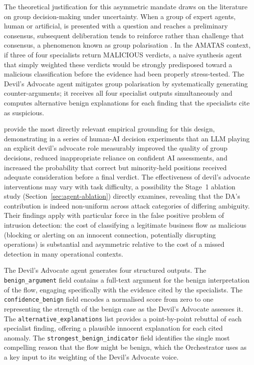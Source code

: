 \documentclass[../main.tex]{subfiles}
\begin{document}
The theoretical justification for this asymmetric mandate draws on the literature on group decision-making under uncertainty. When a group of expert agents, human or artificial, is presented with a question and reaches a preliminary consensus, subsequent deliberation tends to reinforce rather than challenge that consensus, a phenomenon known as group polarisation \autocite{Sunstein2002}. In the AMATAS context, if three of four specialists return MALICIOUS verdicts, a naive synthesis agent that simply weighted these verdicts would be strongly predisposed toward a malicious classification before the evidence had been properly stress-tested. The Devil's Advocate agent mitigates group polarisation by systematically generating counter-arguments; it receives all four specialist outputs simultaneously and computes alternative benign explanations for each finding that the specialists cite as suspicious.

\textcite{Yin2024} provide the most directly relevant empirical grounding for this design, demonstrating in a series of human-AI decision experiments that an LLM playing an explicit devil's advocate role measurably improved the quality of group decisions, reduced inappropriate reliance on confident AI assessments, and increased the probability that correct but minority-held positions received adequate consideration before a final verdict. The effectiveness of devil's advocate interventions may vary with task difficulty, a possibility the Stage~1 ablation study (Section~\ref{sec:agent-ablation}) directly examines, revealing that the DA's contribution is indeed non-uniform across attack categories of differing ambiguity. Their findings apply with particular force in the false positive problem of intrusion detection: the cost of classifying a legitimate business flow as malicious (blocking or alerting on an innocent connection, potentially disrupting operations) is substantial and asymmetric relative to the cost of a missed detection in many operational contexts.

The Devil's Advocate agent generates four structured outputs. The \texttt{benign\_argument} field contains a full-text argument for the benign interpretation of the flow, engaging specifically with the evidence cited by the specialists. The \texttt{confidence\_benign} field encodes a normalised score from zero to one representing the strength of the benign case as the Devil's Advocate assesses it. The \texttt{alternative\_explanations} list provides a point-by-point rebuttal of each specialist finding, offering a plausible innocent explanation for each cited anomaly. The \texttt{strongest\_benign\_indicator} field identifies the single most compelling reason that the flow might be benign, which the Orchestrator uses as a key input to its weighting of the Devil's Advocate voice.
\end{document}

